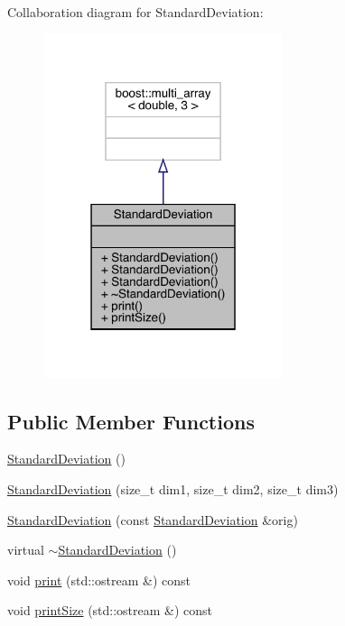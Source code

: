Collaboration diagram for Standard\+Deviation\+:
\nopagebreak
\begin{figure}[H]
\begin{center}
\leavevmode
\includegraphics[width=199pt]{class_standard_deviation__coll__graph}
\end{center}
\end{figure}
\subsection*{Public Member Functions}
\begin{DoxyCompactItemize}
\item 
\mbox{\hyperlink{class_standard_deviation_a526f8eb4fc84a43285d0ab3a8b03a601}{Standard\+Deviation}} ()
\item 
\mbox{\hyperlink{class_standard_deviation_a06f6311463d5386e8c6808582b383541}{Standard\+Deviation}} (size\+\_\+t dim1, size\+\_\+t dim2, size\+\_\+t dim3)
\item 
\mbox{\hyperlink{class_standard_deviation_aab010ad5fec21552c68cad2590bc584d}{Standard\+Deviation}} (const \mbox{\hyperlink{class_standard_deviation}{Standard\+Deviation}} \&orig)
\item 
virtual \mbox{\hyperlink{class_standard_deviation_ad6f5d7923770a9676a8a367c9679a24d}{$\sim$\+Standard\+Deviation}} ()
\item 
void \mbox{\hyperlink{class_standard_deviation_acfc4dabd868f23c413e390b36c291252}{print}} (std\+::ostream \&) const
\item 
void \mbox{\hyperlink{class_standard_deviation_aaad77ff46dc7bc16d870e8569161d9b4}{print\+Size}} (std\+::ostream \&) const
\end{DoxyCompactItemize}
